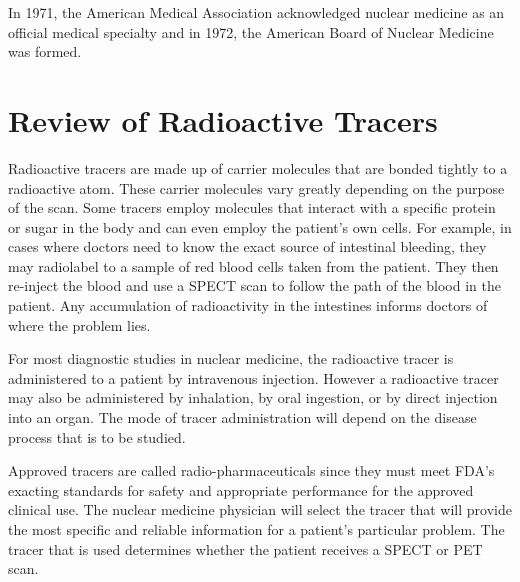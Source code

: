\documentclass{article}
\begin{document}
In 1971, the American Medical Association acknowledged nuclear medicine as an official medical specialty and in 1972, the American Board of Nuclear Medicine was formed.


\section*{Review of Radioactive Tracers}
Radioactive tracers are made up of carrier molecules that are bonded tightly to a radioactive atom. These carrier molecules vary greatly depending on the purpose of the scan. Some tracers employ molecules that interact with a specific protein or sugar in the body and can even employ the patient’s own cells. For example, in cases where doctors need to know the exact source of intestinal bleeding, they may radiolabel to a sample of red blood cells taken from the patient. They then re-inject the blood and use a SPECT scan to follow the path of the blood in the patient. Any accumulation of radioactivity in the intestines informs doctors of where the problem lies.

For most diagnostic studies in nuclear medicine, the radioactive tracer is administered to a patient by intravenous injection. However a radioactive tracer may also be administered by inhalation, by oral ingestion, or by direct injection into an organ. The mode of tracer administration will depend on the disease process that is to be studied.

Approved tracers are called radio-pharmaceuticals since they must meet FDA’s exacting standards for safety and appropriate performance for the approved clinical use. The nuclear medicine physician will select the tracer that will provide the most specific and reliable information for a patient’s particular problem. The tracer that is used determines whether the patient receives a SPECT or PET scan.
\end{document}
